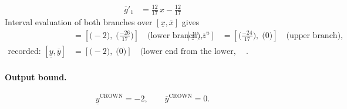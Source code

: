 \documentclass[11pt]{article}
\begin{document}
\begin{align*}
\overline{g}'_{1} &= \frac{12}{17}\,x - \frac{12}{17}
\end{align*}
Interval evaluation of both branches over $[\underline{x}, \overline{x}]$ gives
\begin{align*}
[\underline{z}^{\ell}, \overline{z}^{\ell}] &= [\bigl(-2\bigr),\; \bigl(\frac{-26}{17}\bigr)] \quad\text{(lower branch)}, & [\underline{z}^{u}, \overline{z}^{u}] &= [\bigl(\frac{-24}{17}\bigr),\; \bigl(0\bigr)] \quad\text{(upper branch)}, \\
\text{recorded: } [\underline{y}, \overline{y}] &= [\bigl(-2\bigr),\; \bigl(0\bigr)] \quad\text{(lower end from the lower, upper end from the upper branch)}.
\end{align*}
\paragraph{Output bound.}
\begin{equation*}
\underline{y}^{\text{CROWN}} = -2, \qquad \overline{y}^{\text{CROWN}} = 0.
\end{equation*}
\end{document}
